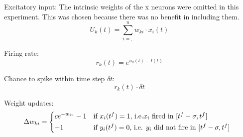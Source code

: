 Excitatory input:
The intrinsic weights of the x neurons were omitted in this experiment. This was chosen because there was no benefit in including them.
\begin{equation}
\label{eqn:uk}
U_k(t) = \sum_{i=,}^n w_{ki} \cdot x_i(t)
\end{equation}

Firing rate:
\begin{equation}
\label{eqn:rk}
r_k(t) = e^{u_k(t) - I(t)}
\end{equation}

Chance to spike within time step $\delta t$:
\begin{equation}
\label{eqn:rkdt}
r_k(t) \cdot \delta t
\end{equation}

Weight updates:
\begin{equation}
\label{deltawki}
\Delta w_{ki} = \begin{dcases*} ce^{-w_{ki}} - 1 & if $x_{i}(t^f) = 1$, i.e.$x_{i}$ fired in $ [t^f - \sigma, t^f] $ \\
-1 & \text{if $ y_i(t^f) = 0 $, i.e. $ y_i $ did not fire in $ [t^f - \sigma, t^f] $ } \end{dcases*}
\end{equation}